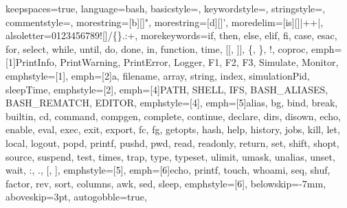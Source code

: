 {%
keepspaces=true,                    %
language=bash,
basicstyle=\ttfamily\small\color{basic-color},
keywordstyle=\color{keywords-color},
stringstyle=\color{strings-color},
commentstyle=\color{comment-color},
morestring=[b][\color{strings-color}]{"},
morestring=[d][\color{strings-color}]{'},
moredelim=[is][\color{basic-color}]{|+}{+|}, %
alsoletter=0123456789![]/\{\}.:+, %
morekeywords={if, then, else, elif, fi, case, esac, for, select, while, until, do, done, in, function, time, [[, ]], \{, \}, !, coproc}, %
emph=[1]{PrintInfo, PrintWarning, PrintError, Logger, F1, F2, F3, Simulate, Monitor},
emphstyle=[1]{\color{functions-color}}, %
emph=[2]{a, filename, array, string, index, simulationPid, sleepTime},
emphstyle=[2]{\color{variables-color}}, %
emph=[4]{PATH, SHELL, IFS, BASH_ALIASES, BASH_REMATCH, EDITOR},
emphstyle=[4]{\color{environment-color}}, %
emph=[5]{alias, bg, bind, break, builtin, cd, command, compgen, complete, continue, declare, dirs, disown, echo, enable, eval,
         exec, exit, export, fc, fg, getopts, hash, help, history, jobs, kill, let, local, logout, popd, printf, pushd, pwd,
         read, readonly, return, set, shift, shopt, source, suspend, test, times, trap, type, typeset, ulimit, umask,
         unalias, unset, wait, :, ., [, ]},
emphstyle=[5]{\color{builtins-color}}, %
emph=[6]{echo, printf, touch, whoami, seq, shuf, factor, rev, sort, columns, awk, sed, sleep},
emphstyle=[6]{\color{external-color}}, %
%
belowskip=-7mm,
aboveskip=3pt,
autogobble=true, %
}

\def\bash{\lstinline[style=MyBash, basicstyle=\ttfamily\color{black}]}

